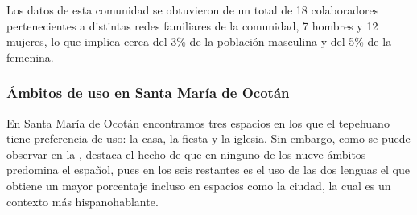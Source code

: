\documentclass[output=paper]{../langscibook}
\begin{document}
Los datos de esta comunidad se obtuvieron de un total de 18 colaboradores pertenecientes a distintas redes familiares de la comunidad, 7 hombres y 12 mujeres, lo que implica cerca del 3\% de la población masculina y del 5\% de la femenina.


 \subsubsection{Ámbitos de uso en Santa María de Ocotán}


En Santa María de Ocotán encontramos tres espacios en los que el tepehuano tiene preferencia de uso: la casa, la fiesta y la iglesia. Sin embargo, como se puede observar en la , destaca el hecho de que en ninguno de los nueve ámbitos predomina el español, pues en los seis restantes es el uso de las dos lenguas el que obtiene un mayor porcentaje incluso en espacios como la ciudad, la cual es un contexto más hispanohablante.
\end{document}
